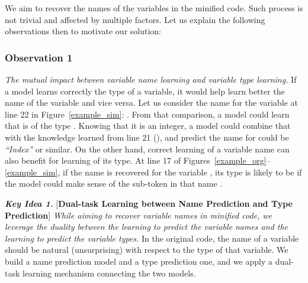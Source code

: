 We aim to recover the names of the variables in the minified
code. Such process is not trivial and affected by multiple factors.
Let us explain the following observations then to motivate our
solution:


\subsubsection*{\bf Observation 1}

{\em The mutual impact between variable name learning and variable
  type learning.} If a model learns correctly the type of a variable,
it would help learn better the name of the variable and vice
versa. Let us consider the name  for the
variable  at line 22 in Figure~\ref{example_sim}: . From that comparison, a model could learn that  is
of the type . Knowing that it is an integer, a model could
combine that with the knowledge learned from line 21 (), and predict the
name for  could be {\em ``Index''} or similar. On the other
hand, correct learning of a variable name can also benefit for
learning of its type. At line 17 of
Figures~\ref{example_org}--\ref{example_sim}, if the name
 is recovered for the variable , its
type is likely to be  if the model could make sense of the
sub-token  in that name .

\vspace{2pt}
{\bf \em Key Idea 1.} [{\bf Dual-task Learning
    between Name Prediction and Type Prediction}] {\em While aiming
  to recover variable names in minified code, we leverage the
  duality between the learning to predict the variable names and the
  learning to predict the variable types.} In the original code, the
name of a variable should be natural (unsurprising) with respect to
the type of that variable. We build a name prediction model and a type
prediction one, and we apply a dual-task learning mechanism connecting
the two models.


\vspace{-3pt}

